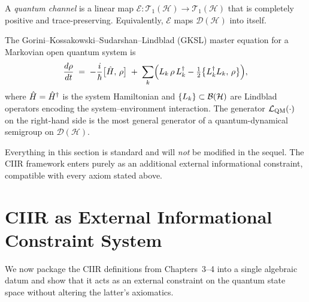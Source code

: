 \begin{definition}
\label{def:10.2}
A \emph{quantum channel} is a linear map
$\mathcal{E}:\mathcal{T}_1(\mathcal{H})\to\mathcal{T}_1(\mathcal{H})$
that is completely positive and trace-preserving.  Equivalently,
$\mathcal{E}$ maps $\mathcal{D}(\mathcal{H})$ into itself.
\end{definition}

\begin{definition}
\label{def:10.3}
The Gorini--Kossakowski--Sudarshan--Lindblad (GKSL) master equation
for a Markovian open quantum system is
\begin{equation}
\label{eq:10.gksl}
  \frac{d\rho}{dt}
  \;=\;
  -\frac{i}{\hbar}\bigl[\hat{H},\,\rho\bigr]
  \;+\;
  \sum_{k}
  \Bigl(
    L_k\,\rho\,L_k^{\dagger}
    -
    \tfrac{1}{2}\bigl\{L_k^{\dagger}L_k,\,\rho\bigr\}
  \Bigr),
\end{equation}
where $\hat{H}=\hat{H}^{\dagger}$ is the system Hamiltonian and
$\{L_k\}\subset\mathcal{B}(\mathcal{H})$ are Lindblad operators encoding the
system--environment interaction.  The generator
$\mathcal{L}_{\mathrm{QM}}(\cdot)$ on the right-hand side is the most general
generator of a quantum-dynamical semigroup on
$\mathcal{D}(\mathcal{H})$.
\end{definition}

\begin{remark}
\label{rem:10.1}
Everything in this section is standard and will \emph{not} be modified
in the sequel.  The CIIR framework enters purely as an additional
external informational constraint, compatible with every axiom stated
above.
\end{remark}

\section{CIIR as External Informational Constraint System}
\label{sec:ch10:ciir_external}

We now package the CIIR definitions from Chapters~3--4 into a single
algebraic datum and show that it acts as an external constraint on the
quantum state space without altering the latter's axiomatics.

